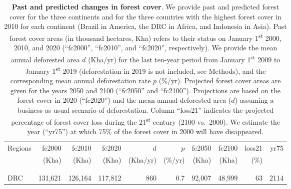 \documentclass[
  12pt,
]{article}
\begin{document}
\begin{table}[H]

\caption{\label{tab:fcc}\textbf{Past and predicted changes in forest cover}. We provide past and predicted forest cover for the three continents and for the three countries with the highest forest cover in 2010 for each continent (Brazil in America, the DRC in Africa, and Indonesia in Asia). Past forest cover areas (in thousand hectares, Kha) refers to their status on January 1\textsuperscript{st} 2000, 2010, and 2020 (``fc2000'', ``fc2010'', and ``fc2020'', respectively). We provide the mean annual deforested area \(d\) (Kha/yr) for the last ten-year period from January 1\textsuperscript{st} 2009 to January 1\textsuperscript{st} 2019 (deforestation in 2019 is not included, see Methods), and the corresponding mean annual deforestation rate \(p\) (\%/yr). Projected forest cover areas are given for the years 2050 and 2100 (``fc2050'' and ``fc2100''). Projections are based on the forest cover in 2020 (``fc2020'') and the mean annual deforested area (\(d\)) assuming a business-as-usual scenario of deforestation. Column ``loss21'' indicates the projected percentage of forest cover loss during the 21\textsuperscript{st} century (2100 vs.~2000). We estimate the year (``yr75'') at which 75\% of the forest cover in 2000 will have disappeared.\vspace{0.5cm}}
\centering
\fontsize{10}{12}\selectfont
\begin{tabular}[t]{lrrrrrrrrr}
\toprule
\multicolumn{1}{l}{Regions} & \multicolumn{1}{r}{fc2000} & \multicolumn{1}{r}{fc2010} & \multicolumn{1}{r}{fc2020} & \multicolumn{1}{r}{$d$} & \multicolumn{1}{r}{$p$} & \multicolumn{1}{r}{fc2050} & \multicolumn{1}{r}{fc2100} & \multicolumn{1}{r}{loss21} & \multicolumn{1}{r}{yr75} \\
 & (Kha) & (Kha) & (Kha) & (Kha/yr) & (\%/yr) & (Kha) & (Kha) & (\%) & \\
\midrule
\addlinespace[0.3em]
\multicolumn{10}{l}{\textbf{Countries}}\\
\cellcolor{gray!6}{\hspace{1em}Brazil} & \cellcolor{gray!6}{375,893} & \cellcolor{gray!6}{349,784} & \cellcolor{gray!6}{334,982} & \cellcolor{gray!6}{1,537} & \cellcolor{gray!6}{0.4} & \cellcolor{gray!6}{288,862} & \cellcolor{gray!6}{211,996} & \cellcolor{gray!6}{44} & \cellcolor{gray!6}{2183}\\
\hspace{1em}DRC & 131,621 & 126,164 & 117,812 & 860 & 0.7 & 92,007 & 48,999 & 63 & 2114\\

\end{tabular}
\end{table}
\end{document}
